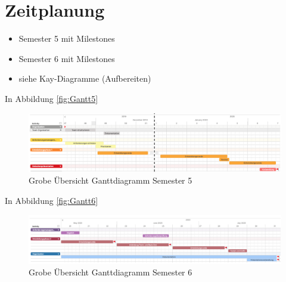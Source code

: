 \section{Zeitplanung}
\begin{itemize}
    \item Semester 5 mit Milestones
    \item Semester 6 mit Milestones
    \item siehe Kay-Diagramme (Aufbereiten)
\end{itemize}

In Abbildung \vref{fig:Gantt5}

\begin{figure}[H]
	\centering 
	\includegraphics[width=\textwidth]{img/GanttSemester5.png}
	\captionsetup{format=hang}
	\caption[Grobe Übersicht Ganttdiagramm Semester 5]{\label{fig:Gantt5}Grobe Übersicht Ganttdiagramm Semester 5}
\end{figure}

In Abbildung \vref{fig:Gantt6}

\begin{figure}[H]
	\centering 
	\includegraphics[width=\textwidth]{img/GanttSemester6.png}
	\captionsetup{format=hang}
	\caption[Grobe Übersicht Ganttdiagramm Semester 6]{\label{fig:Gantt6}Grobe Übersicht Ganttdiagramm Semester 6}
\end{figure}